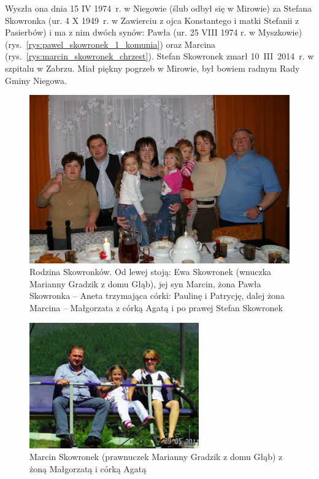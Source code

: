 Wyszła ona dnia 15 IV 1974~r. w Niegowie (ślub odbył się w Mirowie) za Stefana Skowronka (ur. 4 X 1949~r. w Zawierciu z ojca Konstantego i matki Stefanii z Pasierbów) i ma z nim dwóch synów: Pawła (ur. 25 VIII 1974 r. w Myszkowie) (rys.~\ref{rys:pawel_skowronek_1_komunia}) oraz Marcina (rys.~\ref{rys:marcin_skowronek_chrzest}). Stefan Skowronek zmarł 10~III~2014~r. w szpitalu w Zabrzu. Miał piękny pogrzeb w Mirowie, był bowiem radnym Rady Gminy Niegowa.

\begin{figure}[!t]
\begin{center}
\includegraphics[width=\textwidth]{zdjecia/rodzina_skowronkow_1.jpg}
\caption[Rodzina Skowronków]{Rodzina Skowronków. Od lewej stoją: Ewa Skowronek (wnuczka Marianny Gradzik z domu Głąb), jej syn Marcin, żona Pawła Skowronka -- Aneta trzymająca córki: Paulinę i Patrycję, dalej żona Marcina -- Małgorzata z córką Agatą i po prawej Stefan Skowronek}
\label{rys:rodzina_skowronkow_1}
\end{center}
\end{figure}

\begin{figure}[!b]
\begin{center}
\includegraphics[width=0.65\textwidth]{zdjecia/malgorzata_marcin_agata_skowronek.jpg}
\caption[Rodzina Marcina Skowronka]{Marcin Skowronek (prawnuczek Marianny Gradzik z domu Głąb) z żoną Małgorzatą i córką Agatą}
\label{rys:malgorzata_marcin_agata_skowronek}
\end{center}
\end{figure}

